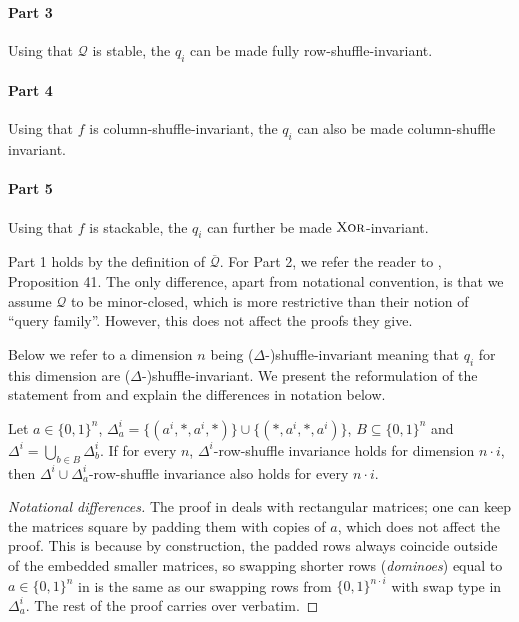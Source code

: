 \documentclass{article}
\begin{document}
\paragraph{Part 3}
Using that $\mathcal{Q}$ is stable, the $q_i$ can be made fully row-shuffle-invariant.

\paragraph{Part 4}
Using that $f$ is column-shuffle-invariant, the $q_i$ can also be made column-shuffle invariant.

\paragraph{Part 5}
Using that $f$ is stackable, the $q_i$ can further be made $\operatorname{\textsc{Xor}}$-invariant.

\medskip


 \medskip

Part 1 holds by the definition of $\overline{\mathcal{Q}}$.
For Part 2, we refer the reader to \cite{FGHH25}, Proposition 41. The only difference, apart from notational convention, is that we assume $\mathcal{Q}$ to be minor-closed, which is more restrictive than their notion of ``query family''. However, this does not affect the proofs they give. 

 Below we refer to a dimension $n$ being ($\Delta$-)shuffle-invariant meaning that $q_i$ for this dimension are ($\Delta$-)shuffle-invariant. We present the reformulation of the statement from \cite{FGHH25} and explain the differences in notation below.

\begin{boxlemma}
\label{lm:part2}
    Let $a \in \{0, 1\}^n$, $\Delta_a^i = \{(a^i, \ast, a^i, \ast)\} \cup \{(\ast, a^i, \ast, a^i)\}$, $B \subseteq \{0, 1\}^n$ and $\Delta^i = \bigcup_{b \in B}\Delta_{b}^{i}$. If for every $n$, $\Delta^i$-row-shuffle invariance holds for dimension $n \cdot i$, then $\Delta^i\cup \Delta_a^i$-row-shuffle invariance also holds for every $n \cdot i$.
\end{boxlemma}
\begin{proof}[Notational differences]
    The proof in \cite{FGHH25} deals with rectangular matrices; one can keep the matrices square by padding them with copies of $a$, which does not affect the proof. This is because by construction, the padded rows always coincide outside of the embedded smaller matrices, so swapping shorter rows (\emph{dominoes}) equal to $a \in \{0, 1\}^n$ in \cite{FGHH25} is the same as our swapping rows from $\{0, 1\}^{n \cdot i}$ with swap type in $\Delta_a^i$. The rest of the proof carries over verbatim.
\end{proof}
\end{document}

